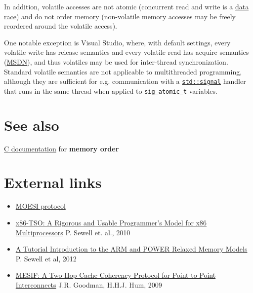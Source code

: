 \documentclass[a4paper,12pt,notitlepage,twoside,openright]{article}
\begin{document}
In addition, volatile accesses are not atomic (concurrent read and write
is a \href{https://en.cppreference.com/w/cpp/language/memory_model}{data
race}) and do not order memory (non-volatile memory accesses may be
freely reordered around the volatile access).

One notable exception is Visual Studio, where, with default settings,
every volatile write has release semantics and every volatile read has
acquire semantics
(\href{http://msdn.microsoft.com/en-us/library/12a04hfd(v=vs.100).aspx}{MSDN}),
and thus volatiles may be used for inter-thread synchronization.
Standard volatile semantics are not applicable to multithreaded
programming, although they are sufficient for e.g. communication with a
\href{https://en.cppreference.com/w/cpp/utility/program/signal}{\texttt{std::signal}}
handler that runs in the same thread when applied to \texttt{sig\_atomic\_t}
variables.

\hypertarget{see-also}{%
\section{See also}\label{see-also}}

\href{https://en.cppreference.com/w/c/atomic/memory_order}{C
documentation} for \textbf{memory order}

\hypertarget{external-links}{%
\section{External links}\label{external-links}}

\begin{itemize}
\item
  \href{https://en.wikipedia.org/wiki/MOESI_protocol}{MOESI protocol}
\item
  \href{http://www.cl.cam.ac.uk/~pes20/weakmemory/cacm.pdf}{x86-TSO: A
  Rigorous and Usable Programmer's Model for x86 Multiprocessors} P.
  Sewell et. al., 2010
\item
  \href{http://www.cl.cam.ac.uk/~pes20/ppc-supplemental/test7.pdf}{A
  Tutorial Introduction to the ARM and POWER Relaxed Memory Models} P.
  Sewell et al, 2012
\item
  \href{https://researchspace.auckland.ac.nz/bitstream/handle/2292/11594/MESIF-2009.pdf?sequence=6}{MESIF:
  A Two-Hop Cache Coherency Protocol for Point-to-Point Interconnects}
  J.R. Goodman, H.H.J. Hum, 2009
\end{itemize}
\end{document}
